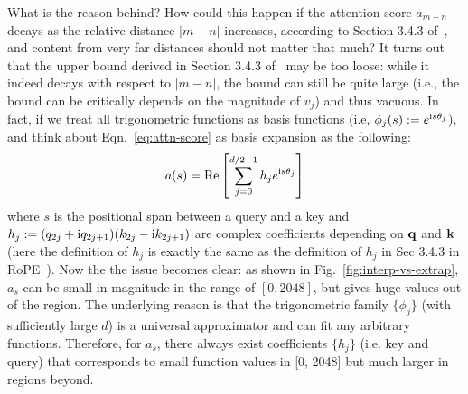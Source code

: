 \documentclass{article} %
\theoremstyle{definition}
\begin{document}
What is the reason behind? How could this happen if the attention score $a_{m-n}$ decays as the relative distance $|m-n|$ increases, according to Section 3.4.3 of~\citep{su2021roformer}, and content from very far distances should not matter that much? It turns out that the upper bound derived in Section 3.4.3 of~\citep{su2021roformer} may be too loose: while it indeed decays with respect to $|m-n|$, the bound can still be quite large (i.e., the bound can be critically depends on the magnitude of $v_j$) and thus vacuous.  
In fact, if we treat all trigonometric functions as basis functions (i.e, $\phi_j(s):=e^{\mathrm{i} s \theta_j}$), and think about Eqn.~\ref{eq:attn-score} as basis expansion as the following:
\begin{equation}
    a(s) = \mathrm{Re}\left[\sum_{j=0}^{d/2-1} h_j e^{\mathrm{i} s \theta_j}\right] \label{eq:attn-basis-expansion}
\end{equation}
where $s$ is the positional span between a query and a key and $h_j := (q_{2j} +\mathrm{i} q_{2j+1})(k_{2j} - \mathrm{i} k_{2j+1})$ are complex coefficients depending on $\mathbf{q}$ and $\mathbf{k}$ (here the definition of $h_j$ is exactly the same as the definition of $h_j$ in Sec 3.4.3 in RoPE~\citep{su2021roformer}). Now the the issue becomes clear: as shown in Fig.~\ref{fig:interp-vs-extrap}, $a_s$ can be small in magnitude in the range of $[0, 2048]$, but gives huge values out of the region. The underlying reason is that the trigonometric family $\{\phi_j\}$ (with sufficiently large $d$) is a universal approximator and can fit any arbitrary functions. Therefore, for $a_s$, there always exist coefficients $\{h_j\}$ (i.e. key and query) that corresponds to small function values in [0, 2048] but much larger in regions beyond. 

\end{document}
